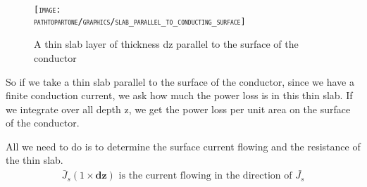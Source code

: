 \begin{figure}
\centering
\textsc{\texttt{[image: \\pathtopartone/graphics/slab\_parallel\_to\_conducting\_surface]}}
\caption{A thin slab layer of thickness dz parallel to the surface of the conductor }
\end{figure}
So if we take a thin slab parallel to the surface of the conductor, since we have a finite conduction current, we ask how much the power loss is in this thin slab. If we integrate over all depth z, we get the power loss per unit area on the surface of the conductor.

All we need to do is to determine the surface current flowing and the resistance of the thin slab.
\begin{align*}
\bar{J}_s(1\times\mathbf{dz})\text{ is the current flowing in the direction of } \bar{J_{s}}
\end{align*}

